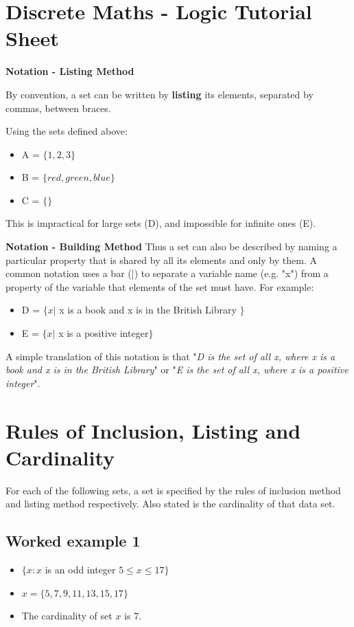 \documentclass[11pt,a4paper,titlepage,oneside,openany]{article}
\numberwithin{equation}{section}
\numberwithin{algorithm}{section}
\numberwithin{figure}{section}
\numberwithin{table}{section}
\begin{document}
\section{Discrete Maths - Logic Tutorial Sheet}



\textbf{Notation - Listing Method}

By convention, a set can be written by \textbf{listing} its elements, separated by commas, between {braces}. 

Using the sets defined above:
\begin{itemize}
\item A = $\{1, 2, 3\}$
\item B = $\{red, green, blue\}$
\item C = $\{\}$
\end{itemize}
This is impractical for large sets (D), and impossible for infinite ones (E). 



\textbf{Notation - Building Method}
Thus a set can also be described by naming a particular property that is shared by all its elements and only by them. A common notation uses a bar (|) to separate a variable name (e.g. "x") from a property of the variable that elements of the set must have. For example:
\begin{itemize}
\item D = $\{x |$ x is a book and x is in the British Library $\}$
\item E = $\{x |$ x is a positive integer$\}$
\end{itemize}
A simple translation of this notation is that "\textit{D is the set of all x, where x is a book and x is in the British Library}" or "\textit{E is the set of all x, where x is a positive integer}".


\section*{Rules of Inclusion, Listing and Cardinality}
For each of the following sets, a set is specified by the rules of inclusion method and listing method respectively. Also stated is the cardinality of that data set.
\subsection*{Worked example 1}
\begin{itemize}
\item $\{ x : x $ is an odd integer $ 5 \leq x \leq 17 \}$
\item $x = \{5,7,9,11,13,15,17\}$
\item The cardinality of set $x$ is 7.
\end{itemize}
\end{document}

